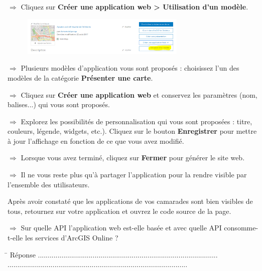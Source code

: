 \documentclass[11pt]{article}
\newcommand{\action}{$\Rightarrow$ }
\newcommand{\reponse}{
	\begin{tabbing}
	\hspace{2cm}\=\kill
	Réponse \> ............................................................................................ \\
 	\> ............................................................................................
	\end{tabbing}
}
\begin{document}
\action Cliquez sur \textbf{Créer une application web > Utilisation d'un modèle}.
\begin{figure}[H]
	\center \includegraphics[width=0.7\textwidth]{img/cours3/ago_creer_appli_web.png} \\
\end{figure}

\action Plusieurs modèles d'application vous sont proposés : choisissez l'un des modèles de la catégorie \textbf{Présenter une carte}.

\action Cliquez sur \textbf{Créer une application web} et conservez les paramètres (nom, balises...) qui vous sont proposés.

\action Explorez les possibilités de personnalisation qui vous sont proposées : titre, couleurs, légende, widgets, etc.). Cliquez sur le bouton \textbf{Enregistrer} pour mettre à jour l'affichage en fonction de ce que vous avez modifié.

\action Lorsque vous avez terminé, cliquez sur \textbf{Fermer} pour générer le site web.

\action Il ne vous reste plus qu'à partager l'application pour la rendre visible par l'ensemble des utilisateurs.

Après avoir constaté que les applications de vos camarades sont bien visibles de tous, retournez sur votre application et ouvrez le code source de la page.

\action Sur quelle API l'application web est-elle basée et avec quelle API consomme-t-elle les services d’ArcGIS Online ?

\reponse
\end{document}
